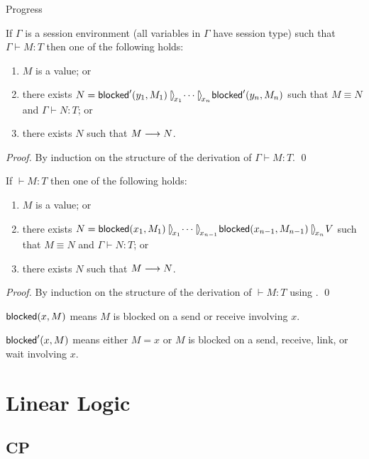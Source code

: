 \documentclass[orivec,envcountsame]{llncs}
\begin{document}
Progress
\begin{theorem}
\label{thm:free-progress}
If $\Gamma$ is a session environment (all variables in $\Gamma$ have session type) such that $\Gamma
\vdash M : T$ then one of the following holds:
\begin{enumerate}
\item $M$ is a value; or
\item there exists $N = \blockedp'(y_1, M_1) \rpar{x_1} \dots \rpar{x_{n}} \blockedp'(y_{n}, M_{n})$
  such that $M \equiv N$ and $\Gamma \vdash N : T$; or
\item there exists $N$ such that $M \longrightarrow N$.
\end{enumerate}
\end{theorem}
%
\begin{proof}
By induction on the structure of the derivation of $\Gamma \vdash M : T$. \qed
\end{proof}

\begin{theorem}
If $\vdash M : T$ then one of the following holds:
\begin{enumerate}
\item $M$ is a value; or
\item there exists $N = \blockedp(x_1, M_1) \rpar{x_1} \dots \rpar{x_{n-1}} \blockedp(x_{n-1},
  M_{n-1}) \rpar{x_n} V$ such that $M \equiv N$ and $\Gamma \vdash N : T$; or
\item there exists $N$ such that $M \longrightarrow N$.
\end{enumerate}
\end{theorem}
%
\begin{proof}
By induction on the structure of the derivation of $\vdash M : T$ using
. \qed
\end{proof}

$\mathsf{blocked}(x, M)$ means $M$ is blocked on a send or receive involving $x$.

$\mathsf{blocked}'(x, M)$ means either $M = x$ or $M$ is blocked on a send, receive, link, or wait
involving $x$.

\section{Linear Logic}

\subsection{CP}
\end{document}
